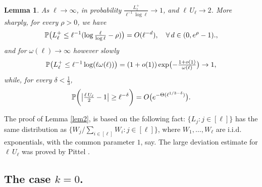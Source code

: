 \documentclass[11pt]{amsart}
\newtheorem{lemma}[theorem]{Lemma}
\theoremstyle{remark}
\numberwithin{equation}{section}
\begin{document}
\begin{lemma}\label{lem0} As $\ell\to\infty$, in probability $\tfrac{L_{\ell}^+}{\ell^{-1}\log \ell}\to 1$, and $\ell\, U_{\ell}\to 2$. More sharply, for every $\rho>0$, we have 
\[
\Bbb P\bigl(L_{\ell}^+\le \ell^{-1}(\log\tfrac{\ell}{\log \ell}-\rho)\bigr)=O(\ell^{-d}), \quad
\forall\,d\in (0,e^{\rho}-1).,
\]
and for $\omega(\ell)\to\infty$ however slowly 
\[
\Bbb P\bigl(L_{\ell}^+\le \ell^{-1}\log(\ell\omega(\ell))\bigr)=(1+o(1))\exp\bigl(-\tfrac{1+o(1)}{\omega(\ell)}\bigr)\to 1, 
\]
while, for every $\delta<\tfrac{1}{3}$,
\[
\Bbb P\biggl(\big|\tfrac{\ell\, U_{\ell}}{2}-1\big|\ge \ell^{-\delta}\biggr)=O\bigl(e^{-\Theta(\ell^{1/3-\delta})}\bigr).
\]
\end{lemma}
The proof of  Lemma \ref{lem2}, is based on the following  fact: $\{L_j: j\in [\ell]\}$ has the same distribution as $\bigl\{W_j/\sum_{i\in [\ell]} W_i: j\in [\ell]\bigr\}$, where $W_1,\dots,W_{\ell}$ are i.i.d. exponentials, with the common parameter $1$, say. The large deviation estimate for $\ell\, U_{\ell}$ was proved by Pittel \cite{Pit3}.
\subsection{The case $k=0$.}
\end{document}
